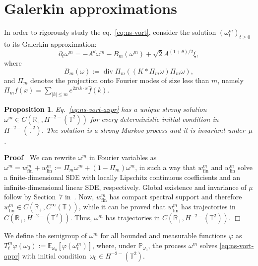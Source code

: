 \documentclass[10pt]{article}
\newcommand{\assign}{:=}
\newcommand{\tmop}[1]{\ensuremath{\operatorname{#1}}}
\newenvironment{proof}{\noindent\textbf{Proof\ }}{\hspace*{\fill}$\Box$\medskip}
\newtheorem{proposition}{Proposition}
{\theorembodyfont{\rmfamily}\newtheorem{remark}{Remark}}
\begin{document}
\section{Galerkin approximations}\label{s:galerkin}

In order to rigorously study the eq.~{\eqref{eq:ns-vort}}, consider the
solution $(\omega^m_t)_{t \geqslant 0}$ to its Galerkin approximation:
\begin{equation}
  \partial_t \omega^m = - A^{\theta} \omega^m - B_m (\omega^m) + \sqrt{2}
  A^{(1 + \theta) / 2} \xi, \label{eq:ns-vort-appr}
\end{equation}
where
\[ B_m (\omega) \assign \tmop{div} \Pi_m ((K \ast \Pi_m \omega) \Pi_m \omega),
\]
and $\Pi_m$ denotes the projection onto Fourier modes of size less than $m$,
namely $\Pi_m f (x) = \sum_{| k | \leqslant m} e^{2 \pi \iota k \cdot x}
\hat{f} (k)$.

\begin{proposition}
  Eq.~{\eqref{eq:ns-vort-appr}} has a unique strong solution $\omega^m \in C
  (\mathbb{R}_+, H^{- 2 -} (\mathbb{T}^2))$ for every deterministic initial
  condition in $H^{- 2 -} (\mathbb{T}^2)$. The solution is a strong Markov
  process and it is invariant under~$\mu$.
\end{proposition}

\begin{proof}
  We can rewrite $\omega^m$ in Fourier variables as $\omega^m =
  w_{\mathrm{\tmop{fin}}}^m + w_{\mathrm{\tmop{lin}}}^m \assign \Pi_m \omega^m
  + (1 - \Pi_m) \omega^m$, in such a way that $w_{\mathrm{\tmop{fin}}}^m$ and
  $w_{\mathrm{\tmop{lin}}}^m$ solve a finite-dimensional SDE with locally
  Lipschitz continuous coefficients and an infinite-dimensional linear SDE,
  respectively. Global existence and invariance of $\mu$ follow by Section~7
  in~{\cite{gubinelli2013regularization}}. Now, $w_{\mathrm{\tmop{fin}}}^m$
  has compact spectral support and therefore $w_{\mathrm{\tmop{fin}}}^m \in C
  (\mathbb{R}_+, C^{\infty} (\mathbb{T}))$, while it can be proved that
  $w_{\mathrm{\tmop{lin}}}^m$ has trajectories in $C (\mathbb{R}_+, H^{- 2 -}
  (\mathbb{T}^2))$. Thus, $\omega^m$ has trajectories in $C (\mathbb{R}_+,
  H^{- 2 -} (\mathbb{T}^2))$.
\end{proof}

We define the semigroup of $\omega^m$ for all bounded and measurable functions
$\varphi$ as $T^m_t \varphi (\omega_0) \assign \mathbb{E}_{\omega_0} [\varphi
(\omega_t^m)]$, where, under $\mathbb{P}_{\omega_0}$, the process $\omega^m$
solves {\eqref{eq:ns-vort-appr}} with initial condition~$\omega_0 \in H^{- 2
-} (\mathbb{T}^2)$.
\end{document}
